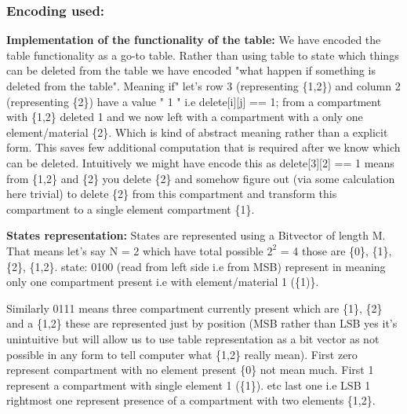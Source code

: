 \documentclass[preprint,12pt]{elsarticle}
\begin{document}
\subsubsection{Encoding used:}

\textbf{Implementation of the functionality of the table:}
We have encoded the table functionality as a go-to table. Rather than using table to state which things can be deleted from the table we have encoded "what happen if something is deleted from the table". Meaning if" let's row 3 (representing \{1,2\}) and column 2 (representing \{2\}) have a value " 1 " i.e delete[i][j] == 1; from a compartment with \{1,2\} deleted {1} and we now left with a compartment with a only one element/material \{2\}. Which is kind of abstract meaning rather than a explicit form. This saves few additional computation that is required after we know which can be deleted. Intuitively we might have encode this as delete[3][2] == 1 means from \{1,2\} and \{2\} you delete \{2\} and somehow figure out (via some calculation  here trivial) to delete \{2\} from this compartment and transform this compartment to a single element compartment \{1\}.

 \textbf{States representation:}
States are represented using a Bitvector of length M. That means let's say N = 2 which have total possible $2^{2}$ = 4 those are \{0\}, \{1\}, \{2\}, \{1,2\}. state: 0100  (read from left side i.e from MSB) represent in  meaning only one compartment present i.e with element/material 1 (\{1)\}. 

Similarly 0111 means three compartment currently present  which are \{1\}, \{2\} and a \{1,2\} these are represented just by position (MSB rather than LSB yes it's unintuitive but will allow  us to use table representation as a bit vector as not possible in any form to tell computer what \{1,2\} really mean). First zero represent compartment with no element present \{0\} not mean much. First  1 represent a compartment with single element 1 (\{1\}). etc last one i.e LSB 1 rightmost one represent presence of a compartment with two elements \{1,2\}.
 
\end{document}

